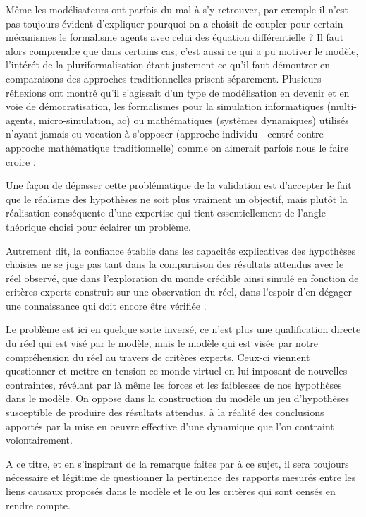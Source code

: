 Même les modélisateurs ont parfois du mal à s'y retrouver, par exemple il n'est pas toujours évident d'expliquer pourquoi on a choisit de coupler pour certain mécanismes le formalisme agents avec celui des équation différentielle ? Il faut alors comprendre que dans certains cas, c'est aussi ce qui a pu motiver le modèle, l'intérét de la pluriformalisation étant justement ce qu'il faut démontrer en comparaisons des approches traditionnelles prisent séparement. Plusieurs réflexions ont montré qu'il s'agissait d'un type de modélisation en devenir et en voie de démocratisation, les formalismes pour la simulation informatiques (multi-agents, micro-simulation, ac) ou mathématiques (systèmes dynamiques) utilisés n'ayant jamais eu vocation à s'opposer (approche individu - centré contre approche mathématique traditionnelle) comme on aimerait parfois nous le faire croire \autocites{Sanders2013, Banos2013}. 


Une façon de dépasser cette problématique de la validation est d'accepter le fait que le réalisme des hypothèses ne soit plus vraiment un objectif, mais plutôt la réalisation conséquente d'une expertise qui tient essentiellement de l'angle théorique choisi pour éclairer un problème.

Autrement dit, la confiance établie dans les capacités explicatives des hypothèses choisies ne se juge pas tant dans la comparaison des résultats attendus avec le réel observé, que dans l'exploration du monde crédible ainsi simulé en fonction de critères experts construit sur une observation du réel, dans l'espoir d'en dégager une connaissance qui doit encore être vérifiée . 

Le problème est ici en quelque sorte inversé, ce n'est plus une qualification directe du réel qui est visé par le modèle, mais le modèle qui est visée par notre compréhension du réel au travers de critères experts. Ceux-ci viennent questionner et mettre en tension ce monde virtuel en lui imposant de nouvelles contraintes, révélant par là même les forces et les faiblesses de nos hypothèses dans le modèle. On oppose dans la construction du modèle un jeu d'hypothèses susceptible de produire des résultats attendus, à la réalité des conclusions apportés par la mise en oeuvre effective d'une dynamique que l'on contraint volontairement.

A ce titre, et en s'inspirant de la remarque faites par \textcite{Bulle2005} à ce sujet, il sera toujours nécessaire et légitime de questionner la pertinence des rapports mesurés entre les liens causaux proposés dans le modèle et le ou les critères qui sont censés en rendre compte.

